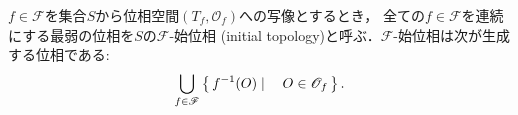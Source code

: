 	\begin{screen}
		\begin{thm}[Alexanderの定理]
		\end{thm}
	\end{screen}
	
	\begin{screen}
		\begin{dfn}[始位相]
			$f \in \mathscr{F}$を集合$S$から位相空間$(T_f,\mathscr{O}_f)$への写像とするとき，
			全ての$f \in \mathscr{F}$を連続にする最弱の位相を$S$の$\mathscr{F}$-始位相
			(initial topology)と呼ぶ．$\mathscr{F}$-始位相は次が生成する位相である:
			\begin{align}
				\bigcup_{f \in \mathscr{F}} \left\{\, f^{-1}(O) \mid \quad O \in \mathscr{O}_f\, \right\}.
			\end{align}
		\end{dfn}
	\end{screen}
	
	\begin{screen}
		\begin{dfn}[Cartesian積の位相]
			
		\end{dfn}
	\end{screen}
	
	\begin{screen}
		\begin{dfn}[直積の位相]
			
		\end{dfn}
	\end{screen}